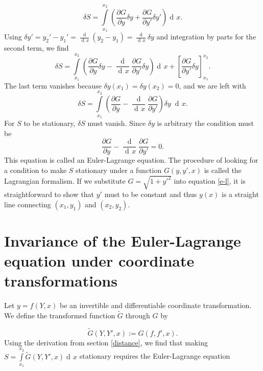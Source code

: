 \documentclass[prb,preprint]{revtex4-1}
\DeclareMathOperator{\dd}{d\!}
\DeclareMathOperator{\ddd}{\mathrm{d}}
\begin{document}
\begin{equation}
\delta S = \int\limits_{x_1}^{x_2} \left(\frac{\partial G}{\partial y} \delta y
+ \frac{\partial G}{\partial y'} \delta y' \right) \dd x.
\end{equation}
Using $\delta y' = y_2' - y_1' = \frac{\ddd }{\dd x}(y_2 - y_1) = \frac{\ddd}{\dd x} \delta y$ and integration by parts for the second term, we find
\begin{equation}
\delta S = \int\limits_{x_1}^{x_2} \left( \frac{\partial G}{\partial y} \delta y
- \frac{\ddd}{\dd x}\frac{\partial G}{\partial y'} \delta y \right) \dd x
+ \left[\frac{\partial G}{\partial y'} \delta y \right]_{x_1}^{x_2}.
\end{equation}
The last term vanishes because $\delta y(x_1) = \delta y(x_2) = 0$, and we are left with
\begin{equation}
\delta S = \int\limits_{x_1}^{x_2} \left( \frac{\partial G}{\partial y}
- \frac{\ddd}{\dd x}\frac{\partial G}{\partial y'} \right) \delta y \; \dd x.
\end{equation}
For $S$ to be stationary, $\delta S$ must vanish. Since $\delta y$ is arbitrary the condition must be
\begin{equation}\label{e-l}
\frac{\partial G}{\partial y} - \frac{\ddd}{\dd x}\frac{\partial G}{\partial y'} = 0.
\end{equation}
This equation is called an Euler-Lagrange equation. The procedure of looking for a condition to make $S$ stationary under a function $G(y,y',x)$ is called the Lagrangian formalism. If we substitute $G = \sqrt{1+y'^2}$ into equation \eqref{e-l}, it is straightforward to show that $y'$ must to be constant and thus $y(x)$ is a straight line connecting $(x_1,y_1)$ and $(x_2,y_2)$.

\section{Invariance of the Euler-Lagrange equation under coordinate transformations \cite{hagen2009path}} \label{invariance}

Let $y=f(Y,x)$ be an invertible and differentiable coordinate transformation. We define the transformed function $\widetilde{G}$ through $G$ by

\begin{equation} \label{lagrangian-transform}
\widetilde{G}(Y,Y',x) := G(f,f',x).
\end{equation}
Using the derivation from section \ref{distance}, we find that making $S = \int\limits_{x_1}^{x_2} \widetilde{G}(Y,Y',x) \dd x$ stationary requires the Euler-Lagrange equation
\end{document}
